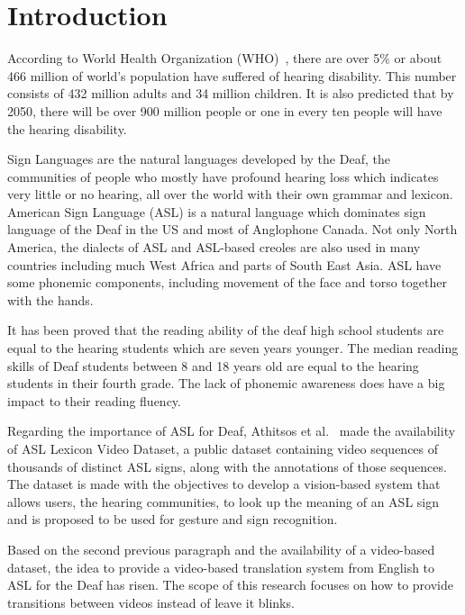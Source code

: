 \documentclass{sig-alternate-05-2015}
\begin{document}
%
%

%
%
\printccsdesc



\section{Introduction}
According to World Health Organization (WHO)~\cite{deafnessAndHearingLoss}, there are over 5\% or about 466 million of world's population have suffered of hearing disability. This number consists of 432 million adults and 34 million children. It is also predicted that by 2050, there will be over 900 million people or one in every ten people will have the hearing disability.

Sign Languages are the natural languages developed by the Deaf, the communities of people who mostly have profound hearing loss which indicates very little or no hearing, all over the world with their own grammar and lexicon. American Sign Language (ASL) is a natural language which dominates sign language of the Deaf in the US and most of Anglophone Canada. Not only North America, the dialects of ASL and ASL-based creoles are also used in many countries including much West Africa and parts of South East Asia. ASL have some phonemic components, including movement of the face and torso together with the hands.

It has been proved that the reading ability of the deaf high school students are equal to the hearing students which are seven years younger. The median reading skills of Deaf students between 8 and 18 years old are equal to the hearing students in their fourth grade. The lack of phonemic awareness does have a big impact to their reading fluency.

Regarding the importance of ASL for Deaf, Athitsos et al.~\cite{ASLLexiconVideoDataset} made the availability of ASL Lexicon Video Dataset, a public dataset containing video sequences of thousands of distinct ASL signs, along with the annotations of those sequences. The dataset is made with the objectives to develop a vision-based system that allows users, the hearing communities, to look up the meaning of an ASL sign and is proposed to be used for gesture and sign recognition. 

Based on the second previous paragraph and the availability of a video-based dataset, the idea to provide a video-based translation system from English to ASL for the Deaf has risen. The scope of this research focuses on how to provide transitions between videos instead of leave it blinks.
\end{document}
